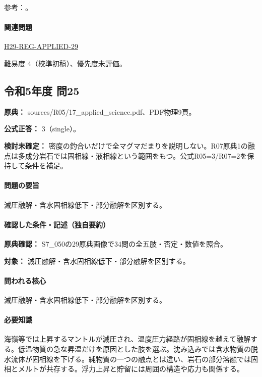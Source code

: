 \par 参考：\cite{vol50_melt_ref,jma_magma1999,vol50_degassing_ref}。

\paragraph{関連問題} \hyperref[q:h29-reg-applied-29]{H29-REG-APPLIED-29}

\par 難易度 4（校準初稿）、優先度未評価。

\subsection{令和5年度 問25}
\label{q:r05-reg-applied-25}

\noindent\textbf{原典：} sources/R05/17\_applied\_science.pdf、PDF物理9頁。

\textbf{公式正答：} 3（single）。

\par\textbf{検討未確定：} 密度の釣合いだけで全マグマだまりを説明しない。R07原典1の融点は多成分岩石では固相線・液相線という範囲をもつ。公式R05=\allowbreak{}3/R07=\allowbreak{}2を保持して条件を補足。

\paragraph{問題の要旨} 減圧融解・含水固相線低下・部分融解を区別する。

\paragraph{確認した条件・記述（独自要約）}\mbox{}\par

\noindent\textbf{原典確認：} S7\_050の29原典画像で34問の全五肢・否定・数値を照合。\par

\noindent\textbf{対象：} 減圧融解・含水固相線低下・部分融解を区別する。\par

\paragraph{問われる核心} 減圧融解・含水固相線低下・部分融解を区別する。

\paragraph{必要知識} 海嶺等では上昇するマントルが減圧され、温度圧力経路が固相線を越えて融解する。低温物質の急な昇温だけを原因とした肢を選ぶ。沈み込みでは含水物質の脱水流体が固相線を下げる。純物質の一つの融点とは違い、岩石の部分溶融では固相とメルトが共存する。浮力上昇と貯留には周囲の構造や応力も関係する。

